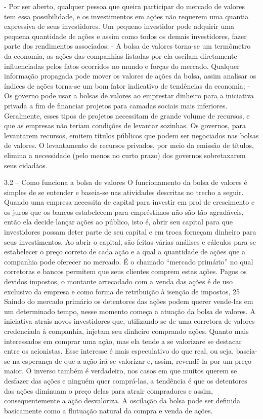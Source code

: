 \documentclass[brazil,twocolumn]{svjour3}
\begin{document}
- Por ser aberto, qualquer pessoa que queira participar do mercado de valores tem essa possibilidade, e os investimentos em ações não requerem uma quantia expressiva de seus investidores. Um pequeno investidor pode adquirir uma pequena quantidade de ações e assim como todos os demais investidores, fazer parte dos rendimentos associados;
- A bolsa de valores torna-se um termômetro da economia, as ações das companhias listadas por ela oscilam diretamente influenciadas pelos fatos ocorridos no mundo e forças do mercado. Qualquer informação propagada pode mover os valores de ações da bolsa, assim analisar os índices de ações torna-se um bom fator indicativo de tendências da economia;
- Os governo pode usar a bolsas de valores ao emprestar dinheiro para a iniciativa privada a fim de financiar projetos para camadas sociais mais inferiores. Geralmente, esses tipos de projetos necessitam de grande volume de recursos, e que as empresas não teriam condições de levantar sozinhas. Os governos, para levantarem recursos, emitem títulos públicos que podem ser negociados nas bolsas de valores. O levantamento de recursos privados, por meio da emissão de títulos, elimina a necessidade (pelo menos no curto prazo) dos governos sobretaxarem seus cidadãos.

3.2 – Como funciona a bolsa de valores
O funcionamento da bolsa de valores é simples de se entender e baseia-se nas atividades descritas no trecho a seguir. Quando uma empresa necessita de capital para investir em prol de crescimento e os juros que os bancos estabelecem para empréstimos não são tão agradáveis, então ela decide lançar ações ao público, isto é, abrir seu capital para que investidores possam deter parte de seu capital e em troca forneçam dinheiro para seus investimentos.
Ao abrir o capital, são feitas várias análises e cálculos para se estabelecer o preço correto de cada ação e a qual a quantidade de ações que a companhia pode oferecer no mercado. É o chamado “mercado primário” no qual corretoras e bancos permitem que seus clientes comprem estas ações.
Pagos os devidos impostos, o montante arrecadado com a venda das ações é de uso exclusivo da empresa e como forma de retribuição à isenção de impostos, 25%
Saindo do mercado primário os detentores das ações podem querer vende-las em um determinado tempo, nesse momento começa a atuação da bolsa de valores. A iniciativa atrais novos investidores que, utilizando-se de uma corretora de valores credenciada à companhia, injetam seu dinheiro comprando ações. Quanto mais interessados em comprar uma ação, mas ela tende a se valorizare se destacar entre os acionistas. Esse interesse é mais especulativo do que real, ou seja, baseia-se na esperança de que a ação irá se valorizar e, assim, revendê-la por um preço maior. O inverso também é verdadeiro, nos casos em que muitos querem se desfazer das ações e ninguém quer comprá-las, a tendência é que os detentores das ações diminuam o preço delas para atrair compradores e assim, consequentemente a ação desvaloriza. A oscilação da bolsa pode ser definida basicamente como a flutuação natural da compra e venda de ações.
\end{document}
